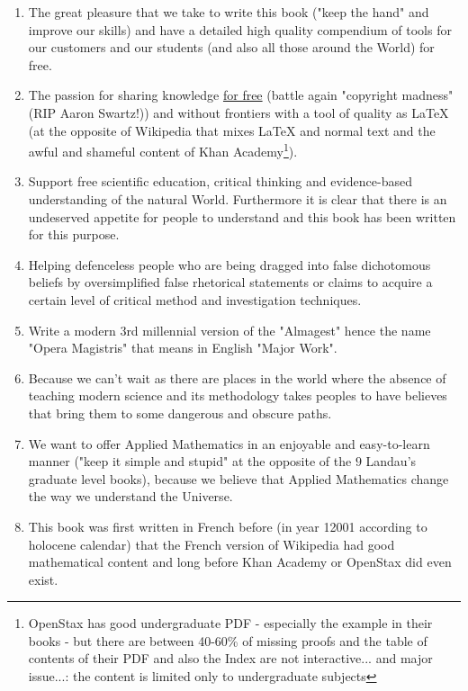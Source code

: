 	\begin{enumerate}
		\item The great pleasure that we take to write this book ("keep the hand" and improve our skills) and have a detailed high quality compendium of tools for our customers and our students (and also all those around the World) for free.

		\item The passion for sharing knowledge \underline{for free} (battle again "copyright madness" (RIP Aaron Swartz!)) and without frontiers with a tool of quality as \LaTeX{} (at the opposite of Wikipedia that mixes \LaTeX{} and normal text and the awful and shameful content of Khan Academy\footnote{OpenStax has good undergraduate PDF - especially the example in their books - but there are between 40-60\% of missing proofs and the table of contents of their PDF and also the Index are not interactive... and major issue...: the content is limited only to undergraduate subjects}).
		
		\item Support free scientific education, critical thinking and evidence-based understanding of the natural World. Furthermore it is clear that there is an undeserved appetite for people to understand and this book has been written for this purpose.
		
		\item Helping defenceless people who are being dragged into false dichotomous beliefs by oversimplified false rhetorical statements or claims to acquire a certain level of critical method and investigation techniques.
		
		\item Write a modern 3rd millennial version of the "Almagest" hence the name "Opera Magistris" that means in English "Major Work".
		
		\item Because we can't wait as there are places in the world where the absence of teaching modern science and its methodology takes peoples to have believes that bring them to some dangerous and obscure paths.
		
		\item We want to offer Applied Mathematics in an enjoyable and easy-to-learn manner ("keep it simple and stupid" at the opposite of the $9$ Landau's graduate level books), because we believe that Applied Mathematics change the way we understand the Universe.
		
		\item This book was first written in French before (in year 12001 according to holocene calendar) that the French version of Wikipedia had good mathematical content and long before Khan Academy or OpenStax did even exist.


\end{enumerate}
